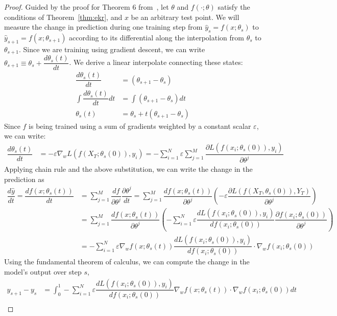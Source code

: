 \begin{proof}
Guided by the proof for Theorem 6 from~\citet{bell2023}, let $\theta$ and $f(\cdot; \theta)$ satisfy the conditions of Theorem~\ref{thm:ekr}, and $x$ be an arbitrary test point. We will measure the change in prediction during one training step from $\hat y_s = f(x; \theta_s)$ to $\hat y_{s+1} = f(x; \theta_{s+1})$ according to its differential along the interpolation from $\theta_s$ to $\theta_{s+1}$. Since we are training using gradient descent, we can write $\theta_{s+1} \equiv \theta_s + \dfrac{d \theta_s(t)}{dt} $. We derive a linear interpolate connecting these states:
\begin{align}
    \dfrac{d \theta_s(t)}{dt} &= (\theta_{s+1} - \theta_s)\\   
    \int \dfrac{d \theta_s(t)}{dt} dt &= \int (\theta_{s+1} - \theta_s)dt\\
    \theta_s(t) &= \theta_s + t(\theta_{s+1} - \theta_s)
\end{align}
Since $f$ is being trained using a sum of gradients weighted by a constant scalar $\varepsilon$, we can write:
\begin{align}
    \dfrac{d \theta_s(t)}{dt} &= -\varepsilon  \nabla_w  L(f(X_T; \theta_s(0)), y_i) = -\sum_{i=1}^N \varepsilon \sum_{j = 1}^{M}   \dfrac{\partial L(f(x_i; \theta_s(0)),  y_i)}{\partial \theta^j} \label{eq10}
\end{align}
Applying chain rule and the above substitution, we can write the change in the prediction as 
\begin{align}
    \dfrac{d \hat y}{dt} = \dfrac{d f(x; \theta_s(t))}{dt} &= \sum_{j = 1}^{M} \dfrac{d f}{\partial \theta^j} \dfrac{\partial \theta^j}{dt} = \sum_{j = 1}^{M} \dfrac{d f(x; \theta_s(t))}{\partial \theta^j} \left(-\varepsilon  \dfrac{\partial L(f(X_T, \theta_s(0)),  Y_T)}{\partial \theta^j}\right)\\
&= \sum_{j = 1}^{M} \dfrac{d f(x; \theta_s(t))}{\partial \theta^j} \left(- \sum_{i = 1}^{N}\varepsilon\dfrac{d L(f(x_i; \theta_s(0)),  y_i)}{d f(x_i; \theta_s(0))}\dfrac{\partial  f(x_i; \theta_s(0))}{\partial \theta^j}\right)\\
&= - \sum_{i = 1}^{N} \varepsilon \nabla_w f(x; \theta_s(t)) \dfrac{d L(f(x_i; \theta_s(0)),  y_i)}{d f(x_i; \theta_s(0))}  \cdot \nabla_w f(x_i; \theta_s(0))
\end{align}
Using the fundamental theorem of calculus, we can compute the change in the model's output over step $s$,
\begin{align}
    y_{s+1} - y_s &= \int_0^1 -\sum_{i = 1}^{N} \varepsilon\dfrac{d L(f(x_i; \theta_s(0)),  y_i)}{d f(x_i; \theta_s(0))}  \nabla_w f(x; \theta_s(t)) \cdot \nabla_w f(x_i; \theta_s(0))dt\\

\end{align}
\end{proof}
